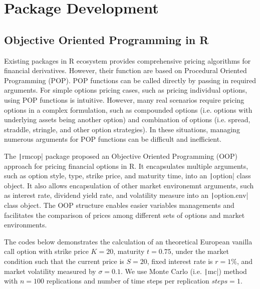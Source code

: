 \chapter{Package Development} \label{cpt:Package Development}


\section{Objective Oriented Programming in R} \label{sec:R OOP}


Existing packages in R ecosystem provides comprehensive pricing algorithms for financial derivatives. However, their function are based on Procedural Oriented Programming (POP). POP functions can be called directly by passing in required arguments. For simple options pricing cases, such as pricing individual options, using POP functions is intuitive. However, many real scenarios require pricing options in a complex formulation, such as compounded options (i.e. options with underlying assets being another option) and combination of options (i.e. spread, straddle, stringle, and other option strategies). In these situations, managing numerous arguments for POP functions can be difficult and inefficient.

The \texttt|rmcop| package proposed an Objective Oriented Programming (OOP) approach for pricing financial options in R. It encapsulates multiple arguments, such as option style, type, strike price, and maturity time, into an \texttt|option| class object. It also allows encapsulation of other market environemnt arguments, such as interest rate, dividend yield rate, and volatility measure into an \texttt|option.env| class object. The OOP structure enables easier variables managements and facilitates the comparison of prices among different sets of options and market environments.

The codes below demonstrates the calculation of an theoretical European vanilla call option with strike price $K = 20$, maturity $t = 0.75$, under the market condition such that the current price is $S = 20$, fixed interest rate is $r = 1\%$, and market volatility measured by $\sigma = 0.1$. We use Monte Carlo (i.e. \texttt|mc|) method with $n = 100$ replications and number of time steps per replication $steps = 1$.

